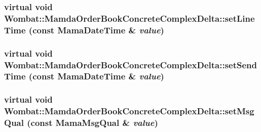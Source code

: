 \hypertarget{classWombat_1_1MamdaOrderBookConcreteComplexDelta_29e994a80713bb1fff43d264851e626c}{
\subsubsection[setLineTime]{\setlength{\rightskip}{0pt plus 5cm}virtual void Wombat::Mamda\-Order\-Book\-Concrete\-Complex\-Delta::set\-Line\-Time (const Mama\-Date\-Time \& {\em value})}}
\label{classWombat_1_1MamdaOrderBookConcreteComplexDelta_29e994a80713bb1fff43d264851e626c}


\hypertarget{classWombat_1_1MamdaOrderBookConcreteComplexDelta_add1bd10d34f04564ed225772237dc7b}{
\subsubsection[setSendTime]{\setlength{\rightskip}{0pt plus 5cm}virtual void Wombat::Mamda\-Order\-Book\-Concrete\-Complex\-Delta::set\-Send\-Time (const Mama\-Date\-Time \& {\em value})}}
\label{classWombat_1_1MamdaOrderBookConcreteComplexDelta_add1bd10d34f04564ed225772237dc7b}


\hypertarget{classWombat_1_1MamdaOrderBookConcreteComplexDelta_a43ff3c8a68481cadeba96a41478e0a9}{
\subsubsection[setMsgQual]{\setlength{\rightskip}{0pt plus 5cm}virtual void Wombat::Mamda\-Order\-Book\-Concrete\-Complex\-Delta::set\-Msg\-Qual (const Mama\-Msg\-Qual \& {\em value})}}
\label{classWombat_1_1MamdaOrderBookConcreteComplexDelta_a43ff3c8a68481cadeba96a41478e0a9}


